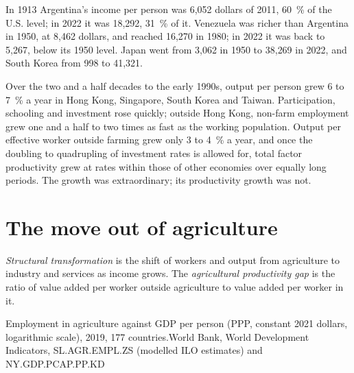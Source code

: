 \begin{record}
In 1913 Argentina's income per person was 6{,}052 dollars of 2011, 60~\% of the U.S. level; in 2022 it was 18{,}292,
31~\% of it. Venezuela was richer than Argentina in 1950, at 8{,}462 dollars, and reached 16{,}270 in 1980; in
2022 it was back to 5{,}267, below its 1950 level. Japan went from 3{,}062 in 1950 to 38{,}269 in 2022, and South
Korea from 998 to 41{,}321. %
\end{record}

\begin{record}
Over the two and a half decades to the early 1990s, output per person grew 6 to 7~\% a
year in Hong Kong,
Singapore, South Korea and Taiwan. Participation, schooling and investment rose
quickly; outside Hong Kong, non-farm employment grew one and a half to two times as
fast as the working population. Output per effective worker outside farming grew
only 3 to 4~\% a year, and once the doubling to quadrupling of investment rates is
allowed for, total factor productivity grew at rates within those of other economies
over equally long periods. The growth was extraordinary; its productivity growth was
not. %
\end{record}

\section{The move out of agriculture}\label{sec:b3:growth-empirics:structural}

\begin{definition}\label{def:b3:growth-empirics:structural}
\emph{Structural transformation} is the shift of workers and output from agriculture
to industry and services as income grows. The \emph{agricultural productivity gap} is
the ratio of value added per worker outside agriculture to value added per worker in
it.
\end{definition}

\begin{omchart}{Employment in agriculture against GDP per person (PPP, constant 2021
dollars, logarithmic scale), 2019, 177 countries.}{World Bank, World Development
Indicators, SL.AGR.EMPL.ZS (modelled ILO estimates) and NY.GDP.PCAP.PP.KD}
\end{omchart}

